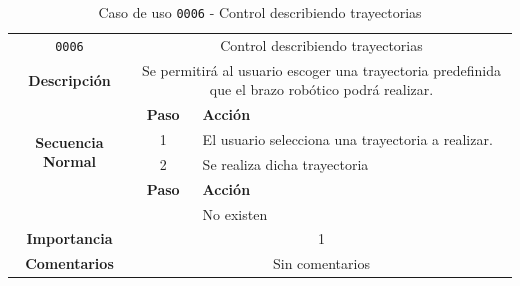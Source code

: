 \begin{table}[H]
    \centering
    \begin{tabularx}{\textwidth}{|c|c|X|}
        \cline{1-3}
        \texttt{0006}        & \multicolumn{2}{c|}{Control describiendo trayectorias}                                      
        \\ \cline{1-3}
        \textbf{Descripción} & \multicolumn{2}{m{13cm}|}{Se permitirá al usuario escoger una trayectoria predefinida que el brazo robótico podrá realizar.}
        \\ \cline{1-3}
        \multirow{4}{*}{\textbf{Secuencia Normal}} & \textbf{Paso} & \textbf{Acción}
        \\ \cline{2-3}                    &   1  & El usuario selecciona una trayectoria a realizar.
        \\ \cline{2-3}                    &   2  & Se realiza dicha trayectoria
        \\ \cline{1-3}
        \multirow{2}{*}{\textbf{Excepciones}} & \textbf{Paso} & \textbf{Acción}
        \\ \cline{2-3}                    &      &  No existen
        \\ \cline{1-3}
        \textbf{Importancia}                 & \multicolumn{2}{c|}{1}           
        \\ \cline{1-3}
        \textbf{Comentarios}                 & \multicolumn{2}{c|}{Sin comentarios}
        \\ \cline{1-3}
    \end{tabularx}
    \caption{Caso de uso \texttt{0006} - Control describiendo trayectorias}
    \label{tab:CU0006}
    \label{tab:caso_de_uso_control_describiendo_trayectorias}
\end{table}


